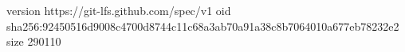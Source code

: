 version https://git-lfs.github.com/spec/v1
oid sha256:92450516d9008c4700d8744c11c68a3ab70a91a38c8b7064010a677eb78232e2
size 290110
